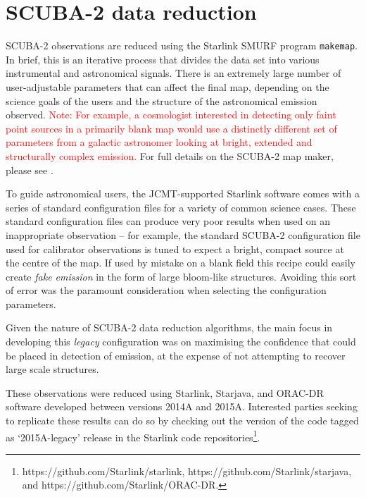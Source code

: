 \documentclass[twocolumn,times]{aastex6}
\newcommand{\note}[1]{\textcolor{red}{Note: #1}}
\begin{document}
\section{SCUBA-2 data reduction}
\label{sec:dr}
SCUBA-2 observations are reduced using the Starlink SMURF program
\texttt{makemap}. In brief, this is an iterative process that divides
the data set into various instrumental and astronomical signals. There
is an extremely large number of user-adjustable parameters that can
affect the final map, depending on the science goals of the users and
the structure of the astronomical emission observed. \note{For example, a
cosmologist interested in detecting only faint point sources in a
primarily blank map would use a distinctly different set of parameters
from a galactic astronomer looking at bright, extended and
structurally complex emission.} For full details on the SCUBA-2 map
maker, please see \citet{Chapin2013}.


To guide astronomical users, the JCMT-supported Starlink software
comes with a series of standard configuration files for a variety of
common science cases.
These standard configuration files can produce very poor results when
used on an inappropriate observation -- for example, the standard
SCUBA-2 configuration file used for calibrator observations is tuned
to expect a bright, compact source at the centre of the map. If used
by mistake on a blank field this recipe could easily create \emph{fake
  emission} in the form of large bloom-like structures. Avoiding this
sort of error was the paramount consideration when selecting the
configuration parameters.

Given the nature of SCUBA-2 data reduction algorithms, the main focus
in developing this \emph{legacy} configuration was on maximising the
confidence that could be placed in detection of emission, at the
expense of not attempting to recover large scale structures.

These observations were reduced using Starlink, Starjava, and ORAC-DR
software developed between versions 2014A and 2015A. Interested
parties seeking to replicate these results can do so by checking out
the version of the code tagged as `2015A-legacy' release in the
Starlink code repositories\footnote{
  https://github.com/Starlink/starlink,\newline
  https://github.com/Starlink/starjava, and \newline
  https://github.com/Starlink/ORAC-DR.}.
\end{document}
